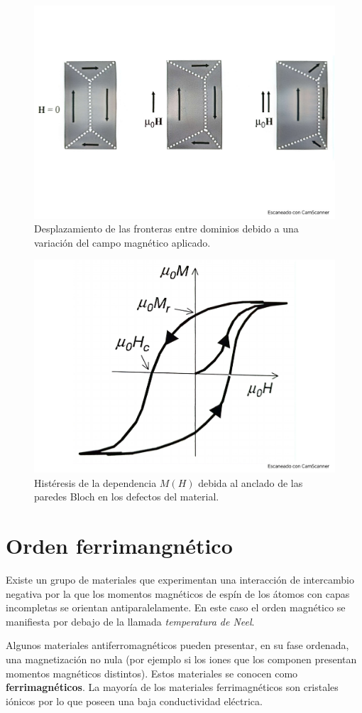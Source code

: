 \begin{figure}[h!] \centering
	\includegraphics[scale=0.35]{Cuerpo/Ch_10/Fotos libro 8.pdf}
	\caption{Desplazamiento de las fronteras entre dominios debido a una variación del campo magnético aplicado.}
	\label{Fig:10-08}
\end{figure}
\begin{figure}[h!] \centering
\includegraphics[scale=0.35]{Cuerpo/Ch_10/Fotos libro 9.pdf}
\caption{Histéresis de la dependencia $M(H)$ debida al anclado de las paredes Bloch en los defectos del material.}
\label{Fig:10-09}
\end{figure}
\section{Orden ferrimangnético}

Existe un grupo de materiales que experimentan una interacción de intercambio negativa por la que los momentos magnéticos de espín de los átomos con capas incompletas se orientan antiparalelamente. En este caso el orden magnético se manifiesta por debajo de la llamada \textit{temperatura de Neel}.

Algunos materiales antiferromagnéticos pueden presentar, en su fase ordenada, una magnetización no nula (por ejemplo si los iones que los componen presentan momentos magnéticos distintos). Estos materiales se conocen como \textbf{ferrimagnéticos}. La mayoría de los materiales ferrimagnéticos son cristales iónicos por lo que poseen una baja conductividad eléctrica.
